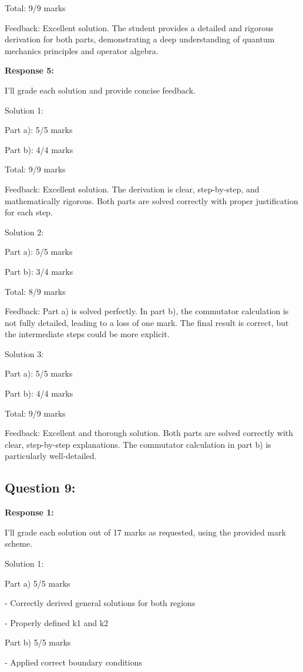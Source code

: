 \documentclass[a4paper,11pt]{article}
\begin{document}
Total: 9/9 marks

Feedback: Excellent solution. The student provides a detailed and rigorous derivation for both parts, demonstrating a deep understanding of quantum mechanics principles and operator algebra.

\bigskip
\textbf{Response 5:}

I'll grade each solution and provide concise feedback.

Solution 1:

Part a): 5/5 marks

Part b): 4/4 marks

Total: 9/9 marks

Feedback: Excellent solution. The derivation is clear, step-by-step, and mathematically rigorous. Both parts are solved correctly with proper justification for each step.

Solution 2:

Part a): 5/5 marks

Part b): 3/4 marks

Total: 8/9 marks

Feedback: Part a) is solved perfectly. In part b), the commutator calculation is not fully detailed, leading to a loss of one mark. The final result is correct, but the intermediate steps could be more explicit.

Solution 3:

Part a): 5/5 marks

Part b): 4/4 marks

Total: 9/9 marks

Feedback: Excellent and thorough solution. Both parts are solved correctly with clear, step-by-step explanations. The commutator calculation in part b) is particularly well-detailed.


\subsection*{Question 9:}

\textbf{Response 1:}

I'll grade each solution out of 17 marks as requested, using the provided mark scheme.

Solution 1:

Part a) 5/5 marks

- Correctly derived general solutions for both regions

- Properly defined k1 and k2

Part b) 5/5 marks

- Applied correct boundary conditions
\end{document}
